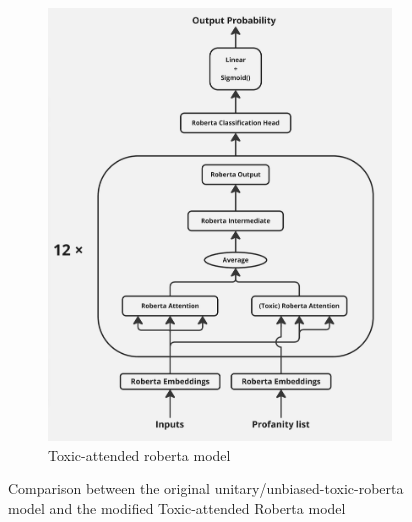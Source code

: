 \begin{figure}[h]
\begin{subfigure}[b]{0.45\linewidth}
        \includegraphics[width=\linewidth]{Images/Screenshot_20241023_113521_Miro.jpg}
        \caption{Toxic-attended roberta model}
        \label{fig:modified-model}
    \end{subfigure}
    
    \caption{Comparison between the original unitary/unbiased-toxic-roberta model and the modified Toxic-attended Roberta model}
    \label{fig:main-figure}
\end{figure}